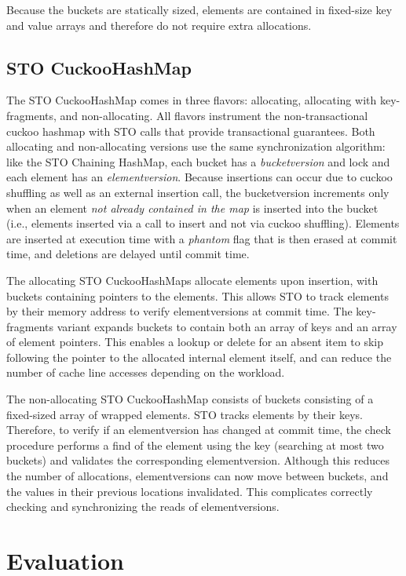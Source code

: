 Because the buckets are statically sized, elements are contained in fixed-size key and value arrays and therefore do not require extra allocations.

\subsection{STO CuckooHashMap}
The STO CuckooHashMap comes in three flavors: allocating, allocating with key-fragments, and non-allocating. All flavors instrument the non-transactional cuckoo hashmap with STO calls that provide transactional guarantees.
Both allocating and non-allocating versions use the same synchronization algorithm: like the STO Chaining HashMap, each bucket has a \emph{bucketversion} and lock and each element has an \emph{elementversion}. Because insertions can occur due to cuckoo shuffling as well as an external insertion call, the bucketversion increments only when an element \emph{not already contained in the map} is inserted into the bucket (i.e., elements inserted via a call to insert and not via cuckoo shuffling). Elements are inserted at execution time with a \emph{phantom} flag that is then erased at commit time, and deletions are delayed until commit time.

The allocating STO CuckooHashMaps allocate elements upon insertion, with buckets containing pointers to the elements. This allows STO to track elements by their memory address to verify elementversions at commit time. The key-fragments variant expands buckets to contain both an array of keys and an array of element pointers. This enables a lookup or delete for an absent item to skip following the pointer to the allocated internal element itself, and can reduce the number of cache line accesses depending on the workload.

The non-allocating STO CuckooHashMap consists of buckets consisting of a fixed-sized array of wrapped elements. STO tracks elements by their keys. Therefore, to verify if an elementversion has changed at commit time, the check procedure performs a find of the element using the key (searching at most two buckets) and validates the corresponding elementversion. Although this reduces the number of allocations, elementversions can now move between buckets, and the values in their previous locations invalidated. This complicates correctly checking and synchronizing the reads of elementversions.

\section{Evaluation}

